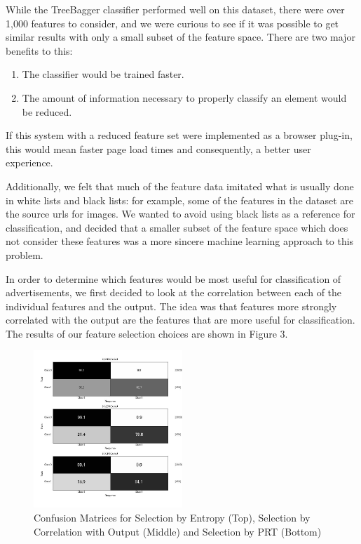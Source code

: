 While the TreeBagger classifier performed well on this dataset, there were over 1,000 features to consider, and we were curious to see if it was possible to get similar results with only a small subset of the feature space. There are two major benefits to this:

\begin{enumerate}
\item The classifier would be trained faster. 
\item The amount of information necessary to properly classify an element would be reduced.
\end{enumerate}

If this system with a reduced feature set were implemented as a browser plug-in, this would mean faster page load times and consequently, a better user experience. 

Additionally, we felt that much of the feature data imitated what is usually done in white lists and black lists: for example, some of the features in the dataset are the source urls for images. We wanted to avoid using black lists as a reference for classification, and decided that a smaller subset of the feature space which does not consider these features was a more sincere machine learning approach to this problem.

In order to determine which features would be most useful for classification of advertisements, we first decided to look at the correlation between each of the individual features and the output\cite{feat}. The idea was that features more strongly correlated with the output are the features that are more useful for classification. The results of our feature selection choices are shown in Figure 3.

\begin{figure}[h!]
  	\label{featselall}
  	\centering
    \includegraphics[width=0.5\textwidth]{Figures/featselall.jpg}
	\caption{Confusion Matrices for Selection by Entropy (Top), Selection by Correlation with Output (Middle) and Selection by PRT (Bottom)}
\end{figure}
 
